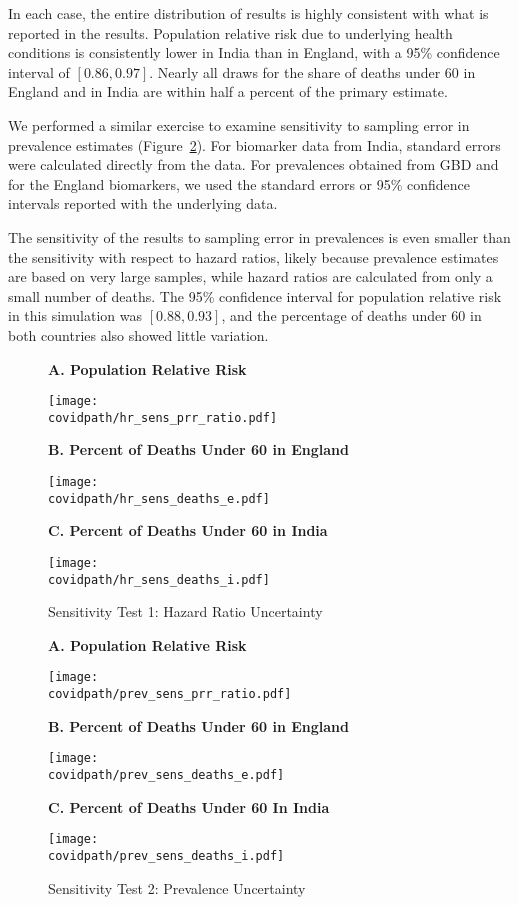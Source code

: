\documentclass[10pt,letterpaper]{article}
\numberwithin{equation}{section}
\begin{document}
In each case, the entire distribution of results is highly consistent with what is reported in the results. Population relative risk due to underlying health conditions is consistently lower in India than in England, with a 95\% confidence interval of $[\num{0.86}, \num{0.97}]$. Nearly all draws for the share of deaths under 60 in England and in India are within half a percent of the primary estimate.

We performed a similar exercise to examine sensitivity to sampling error in prevalence estimates (Figure~\ref{fig:sens_prev}). For biomarker data from India, standard errors were calculated directly from the data. For prevalences obtained from GBD and for the England biomarkers, we used the standard errors or 95\% confidence intervals reported with the underlying data.

The sensitivity of the results to sampling error in prevalences is even smaller than the sensitivity with respect to hazard ratios, likely because prevalence estimates are based on very large samples, while hazard ratios are calculated from only a small number of deaths. The 95\% confidence interval for population relative risk in this simulation was $[\num{0.88}, \num{0.93}]$, and the percentage of deaths under 60 in both countries also showed little variation.

\begin{figure}[H]
  \begin{center}
    \caption{Sensitivity Test 1: Hazard Ratio Uncertainty}
    \label{fig:sens_hr}
    
    \textbf{A. Population Relative Risk}
    
    \texttt{[image: \\covidpath/hr\_sens\_prr\_ratio.pdf]}

    \textbf{B. Percent of Deaths Under 60 in England}
    
    \texttt{[image: \\covidpath/hr\_sens\_deaths\_e.pdf]}

    \textbf{C. Percent of Deaths Under 60 in India}
    
    \texttt{[image: \\covidpath/hr\_sens\_deaths\_i.pdf]}
    
  \end{center}
\end{figure}

\begin{figure}[H]
  \begin{center}
    \caption{Sensitivity Test 2: Prevalence Uncertainty}
    \label{fig:sens_prev}
    
    \textbf{A. Population Relative Risk}
    
    \texttt{[image: \\covidpath/prev\_sens\_prr\_ratio.pdf]}

    \textbf{B. Percent of Deaths Under 60 in England}
    
    \texttt{[image: \\covidpath/prev\_sens\_deaths\_e.pdf]}

    \textbf{C. Percent of Deaths Under 60 In India}
    
    \texttt{[image: \\covidpath/prev\_sens\_deaths\_i.pdf]}
    
  \end{center}
\end{figure}
\end{document}
